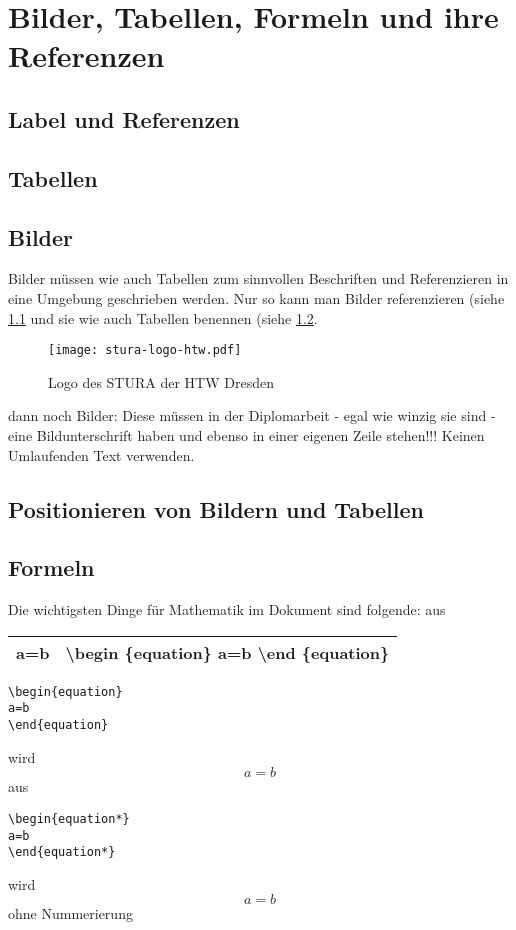 \chapter{Bilder, Tabellen, Formeln und ihre Referenzen}%
%
%
\section{Label und Referenzen}%
\label{sec: labandref}%
%
%
\section{Tabellen}%
\label{sec: tables}%
%
%
\section{Bilder}%
Bilder müssen wie auch Tabellen zum sinnvollen Beschriften und Referenzieren in eine Umgebung geschrieben werden. Nur so kann man Bilder referenzieren (siehe \ref{sec: labandref} und sie wie auch Tabellen benennen (siehe \ref{sec: tables}.%

\begin{figure}[h]%
    \texttt{[image: stura-logo-htw.pdf]}%
    \caption{Logo des STURA der HTW Dresden}%
    \label{fig: stura-logo}%
\end{figure}%
dann noch Bilder:
Diese müssen in der Diplomarbeit - egal wie winzig sie sind - eine Bildunterschrift haben und ebenso in einer eigenen Zeile stehen!!! Keinen Umlaufenden Text verwenden.
%
%
\section{Positionieren von Bildern und Tabellen}%
\section{Formeln}%
Die wichtigsten Dinge für Mathematik im Dokument sind folgende:
aus\\
\begin{tabular}[h]{cc}
\hline 
 a=b  & \textbackslash begin \{equation\} a=b \textbackslash end \{equation\} \\ 
\hline 
\end{tabular} 

\begin{lstlisting}
\begin{equation}
a=b
\end{equation}
\end{lstlisting} 
wird
\begin{equation}
a=b
\end{equation}
aus 
\begin{lstlisting}
\begin{equation*}
a=b
\end{equation*}
\end{lstlisting}
wird
\begin{equation*}
a=b
\end{equation*}
ohne Nummerierung

